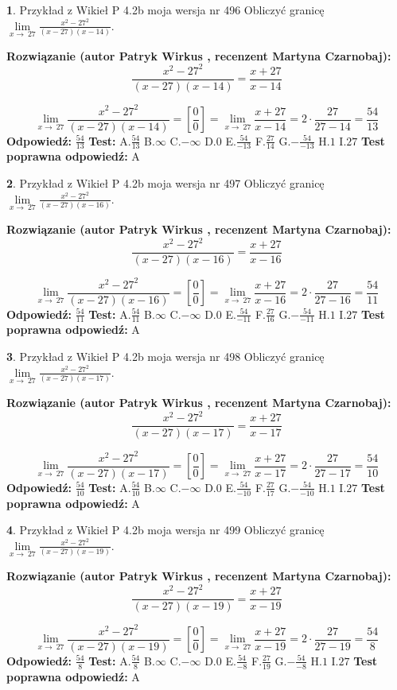 \documentclass[12pt, a4paper]{article}
\theoremstyle{definition} %
\newtheorem{zad}{}
\newcommand{\zadStart}[1]{\begin{zad}#1\newline}
\newcommand{\zadStop}{\end{zad}}
\newcommand{\rozwStart}[2]{\noindent \textbf{Rozwiązanie (autor #1 , recenzent #2): }\newline}
\newcommand{\rozwStop}{\newline}
\newcommand{\odpStart}{\noindent \textbf{Odpowiedź:}\newline}
\newcommand{\odpStop}{\newline}
\newcommand{\testStart}{\noindent \textbf{Test:}\newline}
\newcommand{\testStop}{\newline}
\newcommand{\kluczStart}{\noindent \textbf{Test poprawna odpowiedź:}\newline}
\newcommand{\kluczStop}{\newline}
\begin{document}
\zadStart{Przykład z Wikieł P 4.2b moja wersja nr 496}
Obliczyć granicę $\lim\limits_{x\to\ 27}\frac{x^{2}-27^{2}}{(x-27)(x-14)}$.
\zadStop
\rozwStart{Patryk Wirkus}{Martyna Czarnobaj}
$$\frac{x^{2}-27^{2}}{(x-27)(x-14)}=\frac{x+27}{x-14}$$

$$\lim\limits_{x\to\ 27}\frac{x^{2}-27^{2}}{(x-27)(x-14)}=[\frac{0}{0}]=\lim\limits_{x\to\ 27}\frac{x+27}{x-14}=2 \cdot \frac{27}{27-14} = \frac{54}{13}$$
\rozwStop
\odpStart
$\frac{54}{13}$
\odpStop
\testStart
A.$\frac{54}{13}$
B.$\infty$
C.$-\infty$
D.$0$
E.$\frac{54}{-13}$
F.$\frac{27}{14}$
G.$-\frac{54}{-13}$
H.$1$
I.$27$
\testStop
\kluczStart
A
\kluczStop



\zadStart{Przykład z Wikieł P 4.2b moja wersja nr 497}
Obliczyć granicę $\lim\limits_{x\to\ 27}\frac{x^{2}-27^{2}}{(x-27)(x-16)}$.
\zadStop
\rozwStart{Patryk Wirkus}{Martyna Czarnobaj}
$$\frac{x^{2}-27^{2}}{(x-27)(x-16)}=\frac{x+27}{x-16}$$

$$\lim\limits_{x\to\ 27}\frac{x^{2}-27^{2}}{(x-27)(x-16)}=[\frac{0}{0}]=\lim\limits_{x\to\ 27}\frac{x+27}{x-16}=2 \cdot \frac{27}{27-16} = \frac{54}{11}$$
\rozwStop
\odpStart
$\frac{54}{11}$
\odpStop
\testStart
A.$\frac{54}{11}$
B.$\infty$
C.$-\infty$
D.$0$
E.$\frac{54}{-11}$
F.$\frac{27}{16}$
G.$-\frac{54}{-11}$
H.$1$
I.$27$
\testStop
\kluczStart
A
\kluczStop



\zadStart{Przykład z Wikieł P 4.2b moja wersja nr 498}
Obliczyć granicę $\lim\limits_{x\to\ 27}\frac{x^{2}-27^{2}}{(x-27)(x-17)}$.
\zadStop
\rozwStart{Patryk Wirkus}{Martyna Czarnobaj}
$$\frac{x^{2}-27^{2}}{(x-27)(x-17)}=\frac{x+27}{x-17}$$

$$\lim\limits_{x\to\ 27}\frac{x^{2}-27^{2}}{(x-27)(x-17)}=[\frac{0}{0}]=\lim\limits_{x\to\ 27}\frac{x+27}{x-17}=2 \cdot \frac{27}{27-17} = \frac{54}{10}$$
\rozwStop
\odpStart
$\frac{54}{10}$
\odpStop
\testStart
A.$\frac{54}{10}$
B.$\infty$
C.$-\infty$
D.$0$
E.$\frac{54}{-10}$
F.$\frac{27}{17}$
G.$-\frac{54}{-10}$
H.$1$
I.$27$
\testStop
\kluczStart
A
\kluczStop



\zadStart{Przykład z Wikieł P 4.2b moja wersja nr 499}
Obliczyć granicę $\lim\limits_{x\to\ 27}\frac{x^{2}-27^{2}}{(x-27)(x-19)}$.
\zadStop
\rozwStart{Patryk Wirkus}{Martyna Czarnobaj}
$$\frac{x^{2}-27^{2}}{(x-27)(x-19)}=\frac{x+27}{x-19}$$

$$\lim\limits_{x\to\ 27}\frac{x^{2}-27^{2}}{(x-27)(x-19)}=[\frac{0}{0}]=\lim\limits_{x\to\ 27}\frac{x+27}{x-19}=2 \cdot \frac{27}{27-19} = \frac{54}{8}$$
\rozwStop
\odpStart
$\frac{54}{8}$
\odpStop
\testStart
A.$\frac{54}{8}$
B.$\infty$
C.$-\infty$
D.$0$
E.$\frac{54}{-8}$
F.$\frac{27}{19}$
G.$-\frac{54}{-8}$
H.$1$
I.$27$
\testStop
\kluczStart
A
\kluczStop
\end{document}
